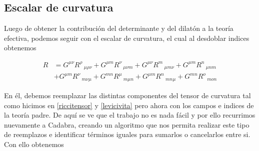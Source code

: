 \documentclass{article}
\numberwithin{equation}{section}
\begin{document}
\subsection{Escalar de curvatura}

Luego de obtener la contribución del determinante y del dilatón a la teoría efectiva, podemos seguir con el escalar de curvatura, el cual al desdoblar indices obtenemos

\begin{equation}
\begin{aligned}
R&= G^{\mu \nu} R^{\rho}\,_{\mu \rho \nu}+G^{\mu m} R^{\nu}\,_{\mu \nu m}+G^{\mu \nu} R^{m}\,_{\mu m \nu}+G^{\mu m} R^{n}\,_{\mu n m}\\
&+G^{\mu m} R^{\nu}\,_{m \nu \mu} + G^{m n} R^{\mu}\,_{m \mu n}+G^{\mu m} R^{n}\,_{m n \mu}+G^{m n} R^{o}\,_{m o n}
\end{aligned}
\end{equation}

En él, debemos reemplazar las distintas componentes del tensor de curvatura tal como hicimos en \ref{riccitensor} y \ref{levicivita} pero ahora con los campos e indices de la teoría padre. De aquí se ve que el trabajo no es nada fácil y por ello recurrimos nuevamente a Cadabra, creando un algoritmo que nos permita realizar este tipo de reemplazos e identificar términos iguales para sumarlos o cancelarlos entre si. Con ello obtenemos
\end{document}
